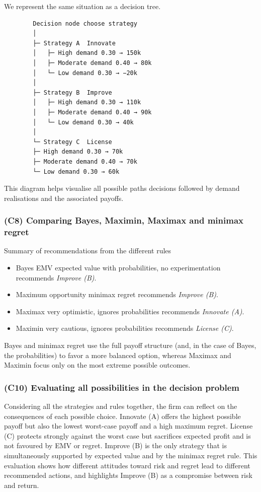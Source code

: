\documentclass[11pt]{article}
\begin{document}
	We represent the same situation as a decision tree.
	
	\begin{verbatim}
		Decision node choose strategy
		│
		├─ Strategy A  Innovate
		│   ├─ High demand 0.30 → 150k
		│   ├─ Moderate demand 0.40 → 80k
		│   └─ Low demand 0.30 → −20k
		│
		├─ Strategy B  Improve
		│   ├─ High demand 0.30 → 110k
		│   ├─ Moderate demand 0.40 → 90k
		│   └─ Low demand 0.30 → 40k
		│
		└─ Strategy C  License
		├─ High demand 0.30 → 70k
		├─ Moderate demand 0.40 → 70k
		└─ Low demand 0.30 → 60k
	\end{verbatim}
	
	This diagram helps visualise all possible paths decisions followed by demand realisations and the associated payoffs.
	
	\subsubsection{(C8) Comparing Bayes, Maximin, Maximax and minimax regret}\label{example-1-c8}
	
	Summary of recommendations from the different rules
	\begin{itemize}
		\item Bayes EMV expected value with probabilities, no experimentation recommends \emph{Improve (B)}.
		\item Maximum opportunity minimax regret recommends \emph{Improve (B)}.
		\item Maximax very optimistic, ignores probabilities recommends \emph{Innovate (A)}.
		\item Maximin very cautious, ignores probabilities recommends \emph{License (C)}.
	\end{itemize}
	
	Bayes and minimax regret use the full payoff structure (and, in the case of Bayes, the probabilities) to favor a more balanced option,
	whereas Maximax and Maximin focus only on the most extreme possible outcomes.
	
	\subsubsection{(C10) Evaluating all possibilities in the decision problem}\label{example-1-c10}
	
	Considering all the strategies and rules together, the firm can reflect on the consequences of each possible choice.
	Innovate (A) offers the highest possible payoff but also the lowest worst-case payoff and a high maximum regret.
	License (C) protects strongly against the worst case but sacrifices expected profit and is not favoured by EMV or regret.
	Improve (B) is the only strategy that is simultaneously supported by expected value and by the minimax regret rule.
	This evaluation shows how different attitudes toward risk and regret lead to different recommended actions,
	and highlights Improve (B) as a compromise between risk and return.
	
\end{document}

